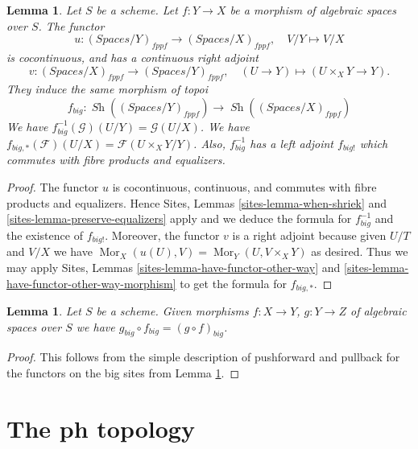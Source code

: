 \documentclass{stacks-project}
\theoremstyle{plain}
\newtheorem{lemma}[subsection]{Lemma}
\theoremstyle{definition}
\theoremstyle{remark}
\numberwithin{equation}{subsection}
\def\Mor{\mathop{\mathrm{Mor}}\nolimits}
\def\Sh{\mathop{\mathit{Sh}}\nolimits}
\begin{document}
\begin{lemma}
\label{lemma-morphism-big-fppf}
Let $S$ be a scheme.
Let $f : Y \to X$ be a morphism of algebraic spaces over $S$.
The functor
$$
u : (\textit{Spaces}/Y)_{fppf} \longrightarrow (\textit{Spaces}/X)_{fppf},
\quad
V/Y \longmapsto V/X
$$
is cocontinuous, and has a continuous right adjoint
$$
v : (\textit{Spaces}/X)_{fppf} \longrightarrow (\textit{Spaces}/Y)_{fppf},
\quad
(U \to Y) \longmapsto (U \times_X Y \to Y).
$$
They induce the same morphism of topoi
$$
f_{big} :
\Sh((\textit{Spaces}/Y)_{fppf})
\longrightarrow
\Sh((\textit{Spaces}/X)_{fppf})
$$
We have $f_{big}^{-1}(\mathcal{G})(U/Y) = \mathcal{G}(U/X)$.
We have $f_{big, *}(\mathcal{F})(U/X) = \mathcal{F}(U \times_X Y/Y)$.
Also, $f_{big}^{-1}$ has a left adjoint $f_{big!}$ which commutes with
fibre products and equalizers.
\end{lemma}

\begin{proof}
The functor $u$ is cocontinuous, continuous, and commutes with fibre products
and equalizers. Hence
Sites, Lemmas \ref{sites-lemma-when-shriek} and
\ref{sites-lemma-preserve-equalizers}
apply and we deduce the formula
for $f_{big}^{-1}$ and the existence of $f_{big!}$. Moreover,
the functor $v$ is a right adjoint because given $U/T$ and $V/X$
we have $\Mor_X(u(U), V) = \Mor_Y(U, V \times_X Y)$
as desired. Thus we may apply
Sites, Lemmas \ref{sites-lemma-have-functor-other-way} and
\ref{sites-lemma-have-functor-other-way-morphism} to get the
formula for $f_{big, *}$.
\end{proof}

\begin{lemma}
\label{lemma-composition-fppf}
Let $S$ be a scheme. Given morphisms $f : X \to Y$, $g : Y \to Z$
of algebraic spaces over $S$ we have
$g_{big} \circ f_{big} = (g \circ f)_{big}$.
\end{lemma}

\begin{proof}
This follows from the simple description of pushforward
and pullback for the functors on the big sites from
Lemma \ref{lemma-morphism-big-fppf}.
\end{proof}








\section{The ph topology}
\label{section-ph}
\end{document}
